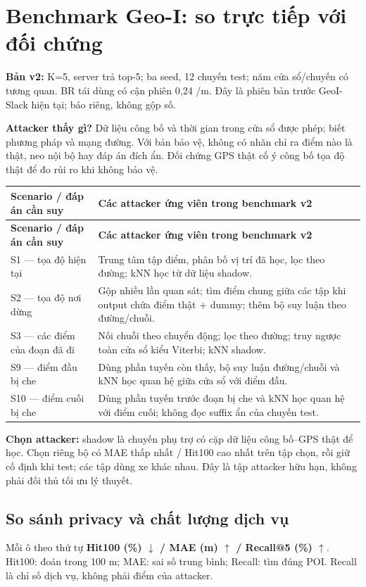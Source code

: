 \section{Benchmark Geo-I: so trực tiếp với đối chứng}
\textbf{Bản v2:} K=5, server trả top-5; ba seed, 12 chuyến test; năm cửa sổ/chuyến có tương quan. BR tái dùng có cận phiên 0,24 /m. Đây là phiên bản trước GeoI-Slack hiện tại; báo riêng, không gộp số.

\textbf{Attacker thấy gì?} Dữ liệu công bố và thời gian trong cửa sổ được phép; biết phương pháp và mạng đường. Với bản bảo vệ, không có nhãn chỉ ra điểm nào là thật, neo nội bộ hay đáp án đích ẩn. Đối chứng GPS thật cố ý công bố tọa độ thật để đo rủi ro khi không bảo vệ.

\begingroup\small
\begin{longtable}{@{}P{4.405cm}P{12.514cm}@{}}
\toprule
\textbf{Scenario / đáp án cần suy} & \textbf{Các attacker ứng viên trong benchmark v2}\\\midrule
\endfirsthead
\toprule
\textbf{Scenario / đáp án cần suy} & \textbf{Các attacker ứng viên trong benchmark v2}\\\midrule
\endhead
\bottomrule\endfoot
S1 — tọa độ hiện tại & Trung tâm tập điểm, phân bố vị trí đã học, lọc theo đường; kNN học từ dữ liệu shadow.\\
\addlinespace[3pt]
S2 — tọa độ nơi dừng & Gộp nhiều lần quan sát; tìm điểm chung giữa các tập khi output chứa điểm thật + dummy; thêm bộ suy luận theo đường/chuỗi.\\
\addlinespace[3pt]
S3 — các điểm của đoạn đã đi & Nối chuỗi theo chuyển động; lọc theo đường; truy ngược toàn cửa sổ kiểu Viterbi; kNN shadow.\\
\addlinespace[3pt]
S9 — điểm đầu bị che & Dùng phần tuyến còn thấy, bộ suy luận đường/chuỗi và kNN học quan hệ giữa cửa sổ với điểm đầu.\\
\addlinespace[3pt]
S10 — điểm cuối bị che & Dùng phần tuyến trước đoạn bị che và kNN học quan hệ với điểm cuối; không đọc suffix ẩn của chuyến test.\\
\end{longtable}
\endgroup
\textbf{Chọn attacker:} shadow là chuyến phụ trợ có cặp dữ liệu công bố–GPS thật để học. Chọn riêng bộ có MAE thấp nhất / Hit100 cao nhất trên tập chọn, rồi giữ cố định khi test; các tập dùng xe khác nhau. Đây là tập attacker hữu hạn, không phải đối thủ tối ưu lý thuyết.

\subsection{So sánh privacy và chất lượng dịch vụ}
Mỗi ô theo thứ tự \textbf{Hit100 (\%) $\downarrow$ / MAE (m) $\uparrow$ / Recall@5 (\%) $\uparrow$}. Hit100: đoán trong 100 m; MAE: sai số trung bình; Recall: tìm đúng POI. Recall là chỉ số dịch vụ, không phải điểm của attacker.

